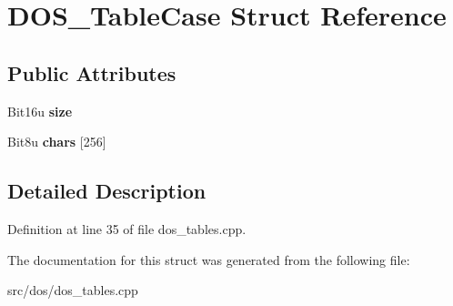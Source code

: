 \hypertarget{structDOS__TableCase}{\section{D\-O\-S\-\_\-\-Table\-Case Struct Reference}
\label{structDOS__TableCase}
}
\subsection*{Public Attributes}
\begin{DoxyCompactItemize}
\item 
\hypertarget{structDOS__TableCase_aa37ae3c4e7b692b2d03feb6048acc20c}{Bit16u {\bfseries size}}\label{structDOS__TableCase_aa37ae3c4e7b692b2d03feb6048acc20c}

\item 
\hypertarget{structDOS__TableCase_ab2e496ce3c2d3bbdb820be16c0a4cd74}{Bit8u {\bfseries chars} \mbox{[}256\mbox{]}}\label{structDOS__TableCase_ab2e496ce3c2d3bbdb820be16c0a4cd74}

\end{DoxyCompactItemize}


\subsection{Detailed Description}


Definition at line 35 of file dos\-\_\-tables.\-cpp.



The documentation for this struct was generated from the following file\-:\begin{DoxyCompactItemize}
\item 
src/dos/dos\-\_\-tables.\-cpp\end{DoxyCompactItemize}
